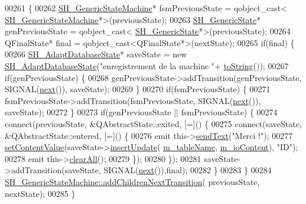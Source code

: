 \begin{DoxyCode}
00261 \{
00262     \hyperlink{classSH__GenericStateMachine}{SH\_GenericStateMachine}* fsmPreviousState = qobject\_cast<
      \hyperlink{classSH__GenericStateMachine}{SH\_GenericStateMachine}*>(previousState);
00263     \hyperlink{classSH__GenericState}{SH\_GenericState}* genPreviousState = qobject\_cast<
      \hyperlink{classSH__GenericState}{SH\_GenericState}*>(previousState);
00264     QFinalState* \textcolor{keyword}{final} = qobject\_cast<QFinalState*>(nextState);
00265     \textcolor{keywordflow}{if}(\textcolor{keyword}{final}) \{
00266         \hyperlink{classSH__AdaptDatabaseState}{SH\_AdaptDatabaseState}* saveState = \textcolor{keyword}{new} 
      \hyperlink{classSH__AdaptDatabaseState}{SH\_AdaptDatabaseState}(\textcolor{stringliteral}{"enregistrement de la machine "}+
      \hyperlink{classSH__GenericStateMachine_a85c0c1c9d258ae991f84667412fa47cd}{toString}());
00267         \textcolor{keywordflow}{if}(genPreviousState) \{
00268             genPreviousState->addTransition(genPreviousState, SIGNAL(\hyperlink{classSH__GenericStateMachine_af4771d31d87951c997fba1633c2d67f6}{next}()), saveState);
00269         \}
00270         \textcolor{keywordflow}{if}(fsmPreviousState) \{
00271             fsmPreviousState->addTransition(fsmPreviousState, SIGNAL(\hyperlink{classSH__GenericStateMachine_af4771d31d87951c997fba1633c2d67f6}{next}()), saveState);
00272         \}
00273         \textcolor{keywordflow}{if}(genPreviousState || fsmPreviousState) \{
00274             connect(previousState, &QAbstractState::exited, [=]() \{
00275                 connect(saveState, &QAbstractState::entered, [=]() \{
00276                     emit this->\hyperlink{classSH__InOutStateMachine_a5e7f5958bae31696b6a8deab94ad2b4f}{sendText}(\textcolor{stringliteral}{"Merci !"});
00277                     \hyperlink{classSH__InOutStateMachine_a9ab1534306b2bdb62743d4bcefe40c17}{setContentValue}(saveState->\hyperlink{classSH__AdaptDatabaseState_a037db544ea05f42d21fcbdda758839fe}{insertUpdate}(
      \hyperlink{classSH__InOutStateMachine_aa009eecc5ab6181358faafb5996b6006}{m\_tableName}, \hyperlink{classSH__InOutStateMachine_a8cfbc27eef057bf37b7711bdfef2077e}{m\_ioContent}), \textcolor{stringliteral}{"ID"});
00278                     emit this->\hyperlink{classSH__InOutStateMachine_aa1d5860888c96ff94c55dc77e0fdfdcf}{clearAll}();
00279                 \});
00280             \});
00281             saveState->addTransition(saveState, SIGNAL(\hyperlink{classSH__GenericStateMachine_af4771d31d87951c997fba1633c2d67f6}{next}()),\textcolor{keyword}{final});
00282         \}
00283     \}
00284     \hyperlink{classSH__GenericStateMachine_a22433f8df2f41120a05bfa4bbfa9e0ae}{SH\_GenericStateMachine::addChildrenNextTransition}(
      previousState, nextState);
00285 \}
\end{DoxyCode}
